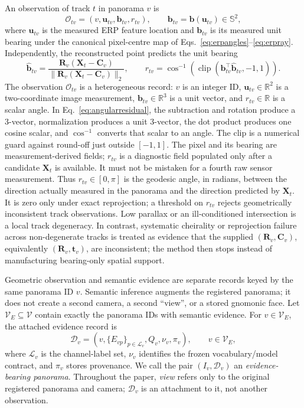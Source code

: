 \documentclass[a4paper,9pt]{extarticle}
\newcommand{\sphere}{\mathbb S^2}
\newcommand{\R}{\mathbb R}
\newcommand{\clip}{\operatorname{clip}}
\begin{document}
An observation of track $t$ in panorama $v$ is
\begin{equation}
 \mathcal O_{tv}=(v,\mathbf u_{tv},\mathbf b_{tv},r_{tv}),
 \qquad \mathbf b_{tv}=\mathbf b(\mathbf u_{tv})\in\sphere,
 \label{eq:trackobservation}
\end{equation}
where $\mathbf u_{tv}$ is the measured ERP feature location and $\mathbf b_{tv}$ is its measured unit bearing under the canonical pixel-centre map of Eqs.~\ref{eq:erpangles}--\ref{eq:erpray}. Independently, the reconstructed point predicts the unit bearing
\begin{equation}
 \widehat{\mathbf b}_{tv}=
 \frac{\mathbf R_v(\mathbf X_t-\mathbf C_v)}
 {\|\mathbf R_v(\mathbf X_t-\mathbf C_v)\|_2},\qquad
 r_{tv}=\cos^{-1}\!\left(
 \clip(\mathbf b_{tv}^{\top}\widehat{\mathbf b}_{tv},-1,1)
 \right).
 \label{eq:angularresidual}
\end{equation}
The observation $\mathcal O_{tv}$ is a heterogeneous record:
$v$ is an integer ID, $\mathbf u_{tv}\in\R^2$ is a two-coordinate image
measurement, $\mathbf b_{tv}\in\R^3$ is a unit vector, and
$r_{tv}\in\R$ is a scalar angle. In Eq.~\ref{eq:angularresidual}, the
subtraction and rotation produce a 3-vector, normalization produces a unit
3-vector, the dot product produces one cosine scalar, and $\cos^{-1}$ converts
that scalar to an angle. The clip is a numerical guard against round-off just
outside $[-1,1]$.
The pixel and its bearing are measurement-derived fields; $r_{tv}$ is a
diagnostic field populated only after a candidate $\mathbf X_t$ is available.
It must not be mistaken for a fourth raw sensor measurement.
Thus $r_{tv}\in[0,\pi]$ is the geodesic angle, in radians, between the direction actually measured in the panorama and the direction predicted by $\mathbf X_t$. It is zero only under exact reprojection; a threshold on $r_{tv}$ rejects geometrically inconsistent track observations. Low parallax or an ill-conditioned intersection is a local track degeneracy. In contrast, systematic cheirality or reprojection failure across non-degenerate tracks is treated as evidence that the supplied $(\mathbf R_v,\mathbf C_v)$, equivalently $(\mathbf R_v,\mathbf t_v)$, are inconsistent; the method then stops instead of manufacturing bearing-only spatial support.

Geometric observation and semantic evidence are separate records keyed by the same panorama ID $v$. Semantic inference augments the registered panorama; it does not create a second camera, a second ``view'', or a stored gnomonic face. Let $\mathcal V_E\subseteq\mathcal V$ contain exactly the panorama IDs with semantic evidence. For $v\in\mathcal V_E$, the attached evidence record is
\begin{equation}
 \mathcal D_v=
 \left(v,\{E_{vp}\}_{p\in\mathcal L_v},
 Q_v,\nu_v,\pi_v\right),\qquad v\in\mathcal V_E,
 \label{eq:evidencerecord}
\end{equation}
where $\mathcal L_v$ is the channel-label set, $\nu_v$ identifies the frozen vocabulary/model contract, and $\pi_v$ stores provenance. We call the pair $(I_v,\mathcal D_v)$ an \emph{evidence-bearing panorama}. Throughout the paper, \emph{view} refers only to the original registered panorama and camera; $\mathcal D_v$ is an attachment to it, not another observation.
\end{document}
